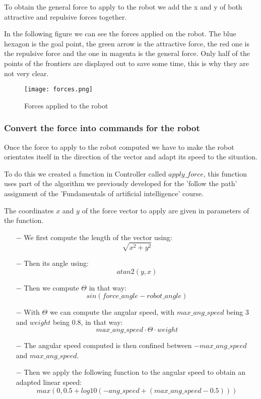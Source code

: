 To obtain the general force to apply to the robot we add the x and y of both attractive and repulsive forces together.

In the following figure we can see the forces applied on the robot.
The blue hexagon is the goal point, the green arrow is the attractive force, the red one is the repulsive force and the one in magenta is the general force.
Only half of the points of the frontiers are displayed out to save some time, this is why they are not very clear.

\FloatBarrier
\begin{figure}
    \centering\texttt{[image: forces.png]}
    \label{fig:forces}
    \caption{Forces applied to the robot}
\end{figure}
\FloatBarrier

\subsubsection{Convert the force into commands for the robot}

Once the force to apply to the robot computed we have to make the robot orientates itself in the direction of the vector and adapt its speed to the situation.

To do this we created a function in Controller called $apply\_force$, this function uses part of the algorithm we previously developed for the 'follow the path' assignment of the 'Fundamentals of artificial intelligence' course.

The coordinates $x$ and $y$ of the force vector to apply are given in parameters of the function.

\begin{itemize}
    \item[$-$] We first compute the length of the vector using:
        $$\sqrt{x^2 + y^2}$$
    \item[$-$] Then its angle using:
        $$atan2(y, x)$$
    \item[$-$] Then we compute $\Theta$ in that way:
        $$sin(force\_angle - robot\_angle)$$
    \item[$-$] With $\Theta$ we can compute the angular speed, with $max\_ang\_speed$ being $3$ and $weight$ being $0.8$, in that way:
        $$max\_ang\_speed \cdot \Theta \cdot weight$$
    \item[$-$] The angular speed computed is then confined between $-max\_ang\_speed$ and $max\_ang\_speed$.
    \item[$-$] Then we apply the following function to the angular speed to obtain an adapted linear speed:
        $$max(0, 0.5 + log10(-ang\_speed + (max\_ang\_speed - 0.5)))$$
\end{itemize}

